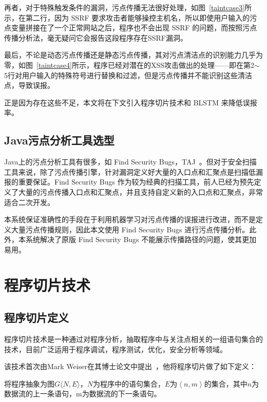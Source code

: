 再者，对于特殊触发条件的漏洞，污点传播无法很好处理，如图~\ref{taintcase3}所示，在第二行，因为 SSRF 要求攻击者能够操控主机名，所以即使用户输入的污点变量拼接在了一个正常网站之后，程序也不会出现 SSRF 的问题，而按照污点传播分析法，毫无疑问它会报告这段程序存在SSRF漏洞。

最后，不论是动态污点传播还是静态污点传播，其对污点清洁点的识别能力几乎为零，如图~\ref{taintcase4}所示，程序已经对潜在的XSS攻击做出的处理——即在第2$\sim$5行对用户输入的特殊符号进行替换和过滤，但是污点传播并不能识别这些清洁点，导致误报。    

正是因为存在这些不足，本文将在下文引入程序切片技术和 BLSTM 来降低误报率。\\

\subsection{Java污点分析工具选型}
Java上的污点分析工具有很多，如 Find Security Bugs，TAJ~\cite{taint:taj}。但对于安全扫描工具来说，除了污点传播引擎，针对漏洞定义好大量的入口点和汇聚点是扫描低漏报的重要保证。Find Security Bugs 作为较为经典的扫描工具，前人已经为预先定义了大量的污点传播入口点和汇聚点，并且支持自定义新的入口点和汇聚点，非常适合二次开发。

本系统保证准确性的手段在于利用机器学习对污点传播的误报进行改进，而不是定义大量污点传播规则，因此本文使用 Find Security Bugs 进行污点传播分析。此外，本系统解决了原版 Find Security Bugs 不能展示传播路径的问题，使其更加易用。\\

\section{程序切片技术}
\subsection{程序切片定义}
程序切片技术是一种通过对程序分析，抽取程序中与关注点相关的一组语句集合的技术，目前广泛运用于程序调试，程序测试，优化，安全分析等领域。

该技术首次由Mark Weiser在其博士论文中提出~\cite{slices:weiser1979}，他将程序切片做了如下定义：

将程序抽象为图$G\langle N,E\rangle$，$N$为程序中的语句集合，$E$为$\left\langle n,m \right\rangle$的集合，其中$n$为数据流的上一条语句，m为数据流的下一条语句。

